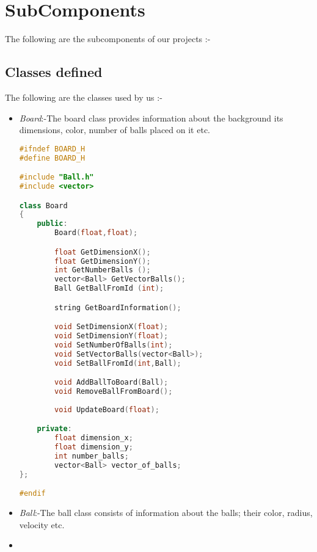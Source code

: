 \section{SubComponents}
The following are the subcomponents of our projects :-
\subsection{Classes defined}
The following are the classes used by us :-
\begin{itemize}
\item \textit{Board}:-The board class provides information about the background its dimensions, color, number of balls placed on it etc.
\usepackage{listings}
\usepackage{color} %

%

\begin{lstlisting}[language=C++, caption={C++ code using listings}]
#ifndef BOARD_H
#define BOARD_H

#include "Ball.h"
#include <vector>

class Board
{
	public:
		Board(float,float);

		float GetDimensionX();
		float GetDimensionY();
		int GetNumberBalls ();
		vector<Ball> GetVectorBalls();
		Ball GetBallFromId (int);

		string GetBoardInformation();

		void SetDimensionX(float);
		void SetDimensionY(float);
		void SetNumberOfBalls(int);
		void SetVectorBalls(vector<Ball>);
		void SetBallFromId(int,Ball);

		void AddBallToBoard(Ball);
		void RemoveBallFromBoard();
		
		void UpdateBoard(float);

	private:
		float dimension_x;
		float dimension_y;
		int number_balls;
		vector<Ball> vector_of_balls;
};

#endif
\end{lstlisting}
%
\item \textit{Ball}:-The ball class consists of information about the balls; their color, radius, velocity etc.
\item\textit{}
\end{itemize}
